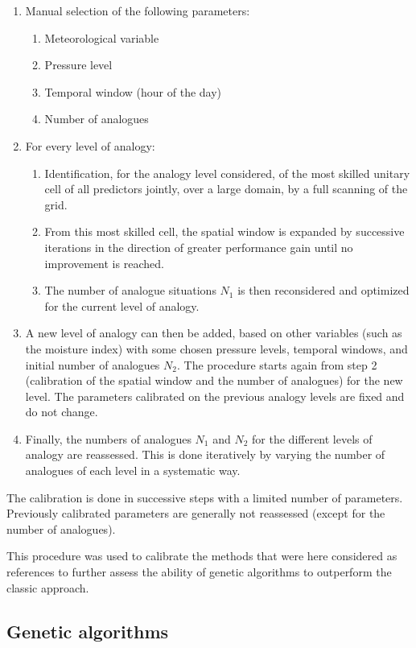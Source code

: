 \documentclass[review]{elsarticle}
\begin{document}
\begin{enumerate}
	\item Manual selection of the following parameters:
	\begin{enumerate}
		\item Meteorological variable
		\item Pressure level
		\item Temporal window (hour of the day)
		\item Number of analogues
	\end{enumerate}
	
	\item For every level of analogy:
	\begin{enumerate}
		\item Identification, for the analogy level considered, of the most skilled unitary cell of all predictors jointly, over a large domain, by a full scanning of the grid.
		\item From this most skilled cell, the spatial window is expanded by successive iterations in the direction of greater performance gain until no improvement is reached.
		\item The number of analogue situations $N_{1}$ is then reconsidered and optimized for the current level of analogy.
	\end{enumerate}
	\item A new level of analogy can then be added, based on other variables (such as the moisture index) with some chosen pressure levels, temporal windows, and initial number of analogues $N_{2}$. The procedure starts again from step 2 (calibration of the spatial window and the number of analogues) for the new level. The parameters calibrated on the previous analogy levels are fixed and do not change. 
	\item Finally, the numbers of analogues $N_{1}$ and $N_{2}$ for the different levels of analogy are reassessed. This is done iteratively by varying the number of analogues of each level in a systematic way.
\end{enumerate}

The calibration is done in successive steps with a limited number of parameters. Previously calibrated parameters are generally not reassessed (except for the number of analogues).

This procedure was used to calibrate the methods that were here considered as references to further assess the ability of genetic algorithms to outperform the classic approach.


\subsection{Genetic algorithms}
\label{sec:gas}
\end{document}

